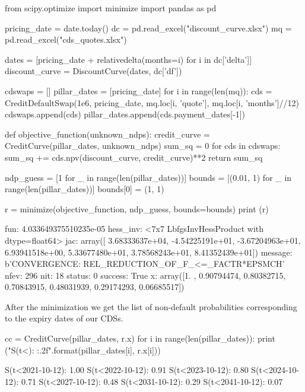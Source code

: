 \begin{ipython}
from scipy.optimize import minimize
import pandas as pd

pricing_date = date.today()
dc = pd.read_excel("discount_curve.xlsx")
mq = pd.read_excel("cds_quotes.xlsx")

dates = [pricing_date + relativedelta(months=i) for i in dc['delta']]
discount_curve = DiscountCurve(dates, dc['df'])

cdswaps = []
pillar_dates = [pricing_date]
for i in range(len(mq)):
    cds = CreditDefaultSwap(1e6, pricing_date,
                            mq.loc[i, 'quote'],
                            mq.loc[i, 'months']//12)
    cdswaps.append(cds)
    pillar_dates.append(cds.payment_dates[-1])

def objective_function(unknown_ndps):
    credit_curve = CreditCurve(pillar_dates, unknown_ndps)
    sum_sq = 0
    for cds in cdswaps:
        sum_sq += cds.npv(discount_curve, credit_curve)**2
    return sum_sq

ndp_guess = [1 for _ in range(len(pillar_dates))]
bounds = [(0.01, 1) for _ in range(len(pillar_dates))]
bounds[0] = (1, 1)

r = minimize(objective_function, ndp_guess, bounds=bounds)
print (r)
\end{ipython}
\begin{ioutput}
      fun: 4.033649375510235e-05
 hess_inv: <7x7 LbfgsInvHessProduct with dtype=float64>
      jac: array([ 3.68333637e+04, -4.54225191e+01, -3.67204963e+01,  
                   6.93941518e+00,  5.33677480e+01,  3.78568243e+01,  
                   8.41352439e+01])
  message: b'CONVERGENCE: REL_REDUCTION_OF_F_<=_FACTR*EPSMCH'
     nfev: 296
      nit: 18
   status: 0
  success: True
        x: array([1.        , 0.90794474, 0.80382715, 0.70843915, 
                  0.48031939, 0.29174293, 0.06685517])
\end{ioutput}

After the minimization we get the list of non-default probabilities corresponding to the expiry dates of our CDSs.

\begin{ipython}
cc = CreditCurve(pillar_dates, r.x)
for i in range(len(pillar_dates)):
    print ("S(t<{}): {:.2f}".format(pillar_dates[i], r.x[i]))
\end{ipython}
\begin{ioutput}
S(t<2021-10-12): 1.00
S(t<2022-10-12): 0.91
S(t<2023-10-12): 0.80
S(t<2024-10-12): 0.71
S(t<2027-10-12): 0.48
S(t<2031-10-12): 0.29
S(t<2041-10-12): 0.07
\end{ioutput}


